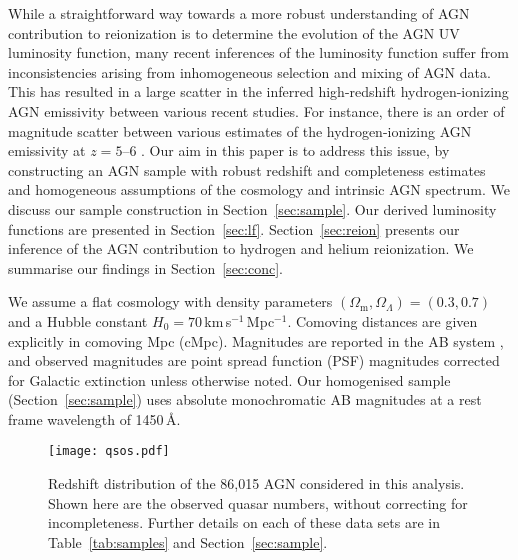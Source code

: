 \documentclass[fleqn,usenatbib]{mnras}
\begin{document}
While a straightforward way towards a more robust understanding of AGN
contribution to reionization is to determine the evolution of the AGN
UV luminosity function, many recent inferences of the luminosity
function suffer from inconsistencies arising from inhomogeneous
selection and mixing of AGN data.  This has resulted in a large
scatter in the inferred high-redshift hydrogen-ionizing AGN emissivity
between various recent studies.  For instance, there is an order of
magnitude scatter between various estimates of the hydrogen-ionizing
AGN emissivity at $z=5$--$6$ \citep{2011ApJ...728L..26G,
  2012ApJ...755..169M, 2015AA...578A..83G, 2018PASJ...70S..34A,
  2018AJ....155..131M, 2018MNRAS.474.2904P, 2017ApJ...847L..15O,
  2017MNRAS.466.1160M}.  Our aim in this paper is to address this
issue, by constructing an AGN sample with robust redshift and
completeness estimates and homogeneous assumptions of the cosmology
and intrinsic AGN spectrum.  We discuss our sample construction in
Section~\ref{sec:sample}.  Our derived luminosity functions are
presented in Section~\ref{sec:lf}.  Section~\ref{sec:reion} presents
our inference of the AGN contribution to hydrogen and helium
reionization.  We summarise our findings in Section~\ref{sec:conc}.

We assume a flat cosmology with density parameters
$\left(\Omega_\mathrm{m},\Omega_\Lambda\right)=\left(0.3,0.7\right)$
and a Hubble constant $H_0=70$\,km\,s$^{-1}$\,Mpc$^{-1}$. Comoving
distances are given explicitly in comoving Mpc (cMpc). Magnitudes
are reported in the AB system \citep{1983ApJ...266..713O}, and
observed magnitudes are point spread function (PSF) magnitudes
\citep{2002AJ....123..485S} corrected for Galactic extinction
\citep{1998ApJ...500..525S} unless otherwise noted.
Our homogenised sample (Section~\ref{sec:sample}) uses absolute
monochromatic AB magnitudes at a rest frame wavelength of 1450\,\AA.


\begin{figure*}
  \begin{center}
    \texttt{[image: qsos.pdf]}
  \end{center}
  \caption{Redshift distribution of the 86,015 AGN considered in this
    analysis.  Shown here are the observed quasar numbers, without
    correcting for incompleteness.  Further details on each of these
    data sets are in Table~\ref{tab:samples} and
    Section~\ref{sec:sample}.}
  \label{fig:qsos}
\end{figure*}
\end{document}
